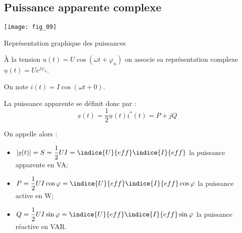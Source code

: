 \subsection{Puissance apparente complexe}




\begin{marginfigure}
\texttt{[image: fig\_09]}
\caption{Représentation graphique des puissances\label{fig:ge:cours:fig_09}}
\end{marginfigure}

\begin{defi}
À la tension $u(t)=U\cos\left( \omega t + \varphi_u\right)$ on associe sa représentation complexe 
$\underline{u}(t)=Ue^{j\varphi_u}$.

On note  $i(t)=I\cos\left( \omega t + 0\right)$.%

La puissance apparente se définit donc par : 
$$ \underline{s}(t) = \dfrac{1}{2}\underline{u}(t)\underline{i}^*(t) = P + j Q $$ 
%
%

On appelle alors :
\begin{itemize}
\item $|\underline{s}(t)| = S = \dfrac{1}{2}UI = \indice{U}{eff}\indice{I}{eff}$ la puissance apparente en \si{VA};
\item $P = \dfrac{1}{2}UI\cos\varphi = \indice{U}{eff}\indice{I}{eff} \cos\varphi$ la puissance active en \si{W};
\item $Q = \dfrac{1}{2}UI\sin\varphi = \indice{U}{eff}\indice{I}{eff} \sin\varphi$ la puissance réactive en \si{VAR}.
\end{itemize}
\end{defi}





